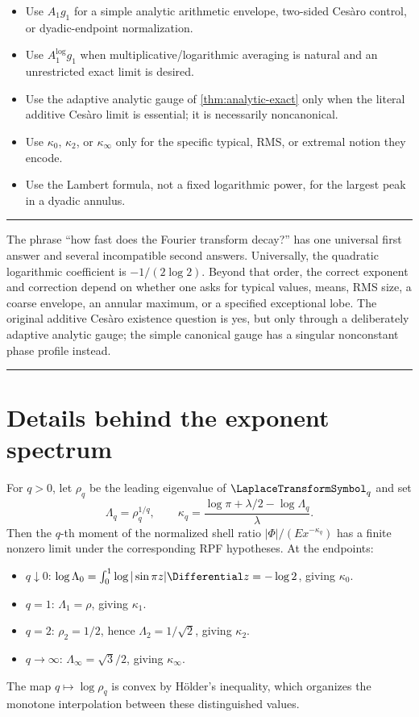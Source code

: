 \documentclass[11pt,oneside]{article}
\theoremstyle{definition}
\theoremstyle{remark}
\newenvironment{boxedremark}{%
  \par\smallskip\noindent\begin{center}\begin{minipage}{0.94\textwidth}%
  \color{black}\hrule\vspace{0.6em}\small
}{%
  \vspace{0.6em}\hrule\end{minipage}\end{center}\smallskip
}
\begin{document}
\begin{itemize}
\item Use \(A_1g_1\) for a simple analytic arithmetic envelope, two-sided
Ces\`aro control, or dyadic-endpoint normalization.
\item Use \(A_1^{\log}g_1\) when multiplicative/logarithmic averaging is
natural and an unrestricted exact limit is desired.
\item Use the adaptive analytic gauge of \cref{thm:analytic-exact} only when the
literal additive Ces\`aro limit is essential; it is necessarily noncanonical.
\item Use \(\kappa_0\), \(\kappa_2\), or \(\kappa_\infty\) only for the
specific typical, RMS, or extremal notion they encode.
\item Use the Lambert formula, not a fixed logarithmic power, for the largest
peak in a dyadic annulus.
\end{itemize}

\begin{boxedremark}
The phrase ``how fast does the Fourier transform decay?'' has one universal
first answer and several incompatible second answers.  Universally, the
quadratic logarithmic coefficient is \(-1/(2\log2)\).  Beyond that order, the
correct exponent and correction depend on whether one asks for typical values,
means, RMS size, a coarse envelope, an annular maximum, or a specified
exceptional lobe.  The original additive Ces\`aro existence question is yes,
but only through a deliberately adaptive analytic gauge; the simple canonical
gauge has a singular nonconstant phase profile instead.
\end{boxedremark}

\appendix

\section{Details behind the exponent spectrum}
\label{app:spectrum}

For \(q>0\), let \(\rho_q\) be the leading eigenvalue of \(\LaplaceTransformSymbol_q\) and set
\begin{equation}
 \Lambda_q=\rho_q^{1/q},
 \qquad
 \kappa_q=\frac{\log\pi+\lambda/2-\log\Lambda_q}{\lambda}.
 \label{eq:q-spectrum}
\end{equation}
Then the \(q\)-th moment of the normalized shell ratio
\(|\Phi|/(E x^{-\kappa_q})\) has a finite nonzero limit under the corresponding
RPF hypotheses.  At the endpoints:
\begin{itemize}
\item \(q\downarrow0\):
\(\log\Lambda_0=\int_0^1\log|\sin\pi z|\Differential z=-\log2\), giving
\(\kappa_0\).
\item \(q=1\): \(\Lambda_1=\rho\), giving \(\kappa_1\).
\item \(q=2\): \(\rho_2=1/2\), hence \(\Lambda_2=1/\sqrt2\), giving
\(\kappa_2\).
\item \(q\to\infty\): \(\Lambda_\infty=\sqrt3/2\), giving
\(\kappa_\infty\).
\end{itemize}
The map \(q\mapsto\log\rho_q\) is convex by H\"older's inequality, which
organizes the monotone interpolation between these distinguished values.
\end{document}

